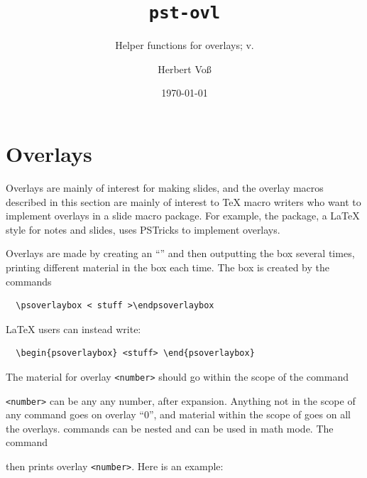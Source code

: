 \documentclass[fontsize=11pt,english,BCOR10mm,DIV12,bibliography=totoc,parskip=false,
   smallheadings, headexclude,footexclude,oneside]{pst-doc}
\let\pstOVLFV\fileversion
\begin{document}
\title{\texttt{pst-ovl}}
\subtitle{Helper functions for overlays; v.\pstOVLFV}
\author{Herbert Voß}
\docauthor{}
\date{\today}
\maketitle

\tableofcontents
{}

\section{Overlays}

Overlays are mainly of interest for making slides, and the overlay macros
described in this section are mainly of interest to \TeX{} macro writers who
want to implement overlays in a slide macro package.  For example, the
 package, a \LaTeX{} style for notes and slides, uses PSTricks to
implement overlays.

Overlays are made by creating an "`"' and then outputting the box several
times, printing different material in the box each time. The box is created by
the commands
\begin{lstlisting}
  \psoverlaybox < stuff >\endpsoverlaybox
\end{lstlisting}
\LaTeX{} users can instead write:
\begin{lstlisting}
  \begin{psoverlaybox} <stuff> \end{psoverlaybox}
\end{lstlisting}

The material for overlay \texttt{<number>} should go within the scope of the command


\texttt{<number>} can be any any number, after expansion. Anything not in the scope of any
 command goes on overlay "`0"', and material within the scope of
 goes on all the overlays. 
commands can be nested and can be used in math mode.
The command


then prints overlay \texttt{<number>}.
%
Here is an example:

\begin{LTXexample}[pos=t]
\psoverlaybox
{}
 \endpsoverlaybox

 \hspace{.5in} 
\end{LTXexample}
\end{document}

